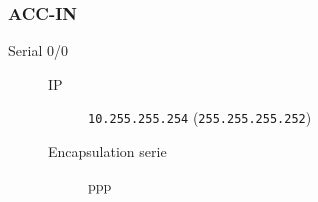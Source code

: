 \subsubsection{ACC-IN}

	\begin{description}
		\item[Serial 0/0] 
		\begin{description}
			\item[IP] \texttt{10.255.255.254} (\texttt{255.255.255.252})
			\item[Encapsulation serie] ppp
		\end{description}

	\end{description}
